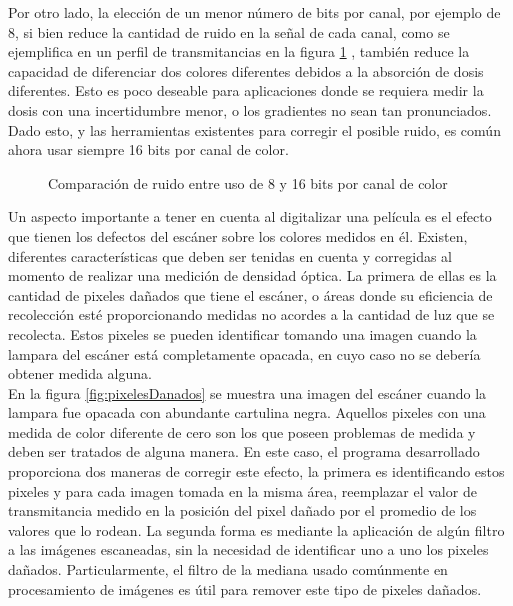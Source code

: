 Por otro lado, la elección de un menor número de bits por canal, por ejemplo de 8, si bien reduce la cantidad de ruido en la señal de cada canal, como se ejemplifica en un perfil de transmitancias en la figura \ref{fig:ruidoBits} , también reduce la capacidad de diferenciar dos colores diferentes debidos a la absorción de dosis diferentes. Esto es poco deseable para aplicaciones donde se requiera medir la dosis con una incertidumbre menor, o los gradientes no sean tan pronunciados. Dado esto, y las herramientas existentes para corregir el posible ruido, es común ahora usar siempre 16 bits por canal de color.\\

\begin{figure}
	\centering
	
	\caption{Comparación de ruido entre uso de 8 y 16 bits por canal de color}
	\label{fig:ruidoBits}
\end{figure}

Un aspecto importante a tener en cuenta al digitalizar una película es el efecto que tienen los defectos del escáner sobre los colores medidos en él. Existen, diferentes características que deben ser tenidas en cuenta y corregidas al momento de realizar una medición de densidad óptica. La primera de ellas es la cantidad de pixeles dañados que tiene el escáner, o áreas donde su eficiencia de recolección esté proporcionando medidas no acordes a la cantidad de luz que se recolecta. Estos pixeles se pueden identificar tomando una imagen cuando la lampara del escáner está completamente opacada, en cuyo caso no se debería obtener medida alguna.  \\

En la figura \ref{fig:pixelesDanados} se muestra una imagen del escáner cuando la lampara fue opacada con abundante cartulina negra. Aquellos pixeles con una medida de color diferente de cero son los que poseen problemas de medida y deben ser tratados de alguna manera. En este caso, el programa desarrollado proporciona dos maneras de corregir este efecto, la primera es identificando estos pixeles y para cada imagen tomada en la misma área, reemplazar el valor de transmitancia medido en la posición del pixel dañado por el promedio de los valores que lo rodean. La segunda forma es mediante la aplicación de algún filtro a las imágenes escaneadas, sin la necesidad de identificar uno a uno los pixeles dañados. Particularmente, el filtro de la mediana usado comúnmente en procesamiento de imágenes es útil para remover este tipo de pixeles dañados.\\ 

